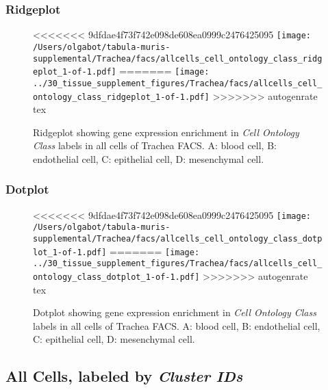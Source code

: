\subsubsection{Ridgeplot}
\begin{figure}[h]
\centering
<<<<<<< 9dfdae4f73f742e098de608ea0999c2476425095
\texttt{[image: /Users/olgabot/tabula-muris-supplemental/Trachea/facs/allcells\_cell\_ontology\_class\_ridgeplot\_1-of-1.pdf]}
=======
\texttt{[image: ../30\_tissue\_supplement\_figures/Trachea/facs/allcells\_cell\_ontology\_class\_ridgeplot\_1-of-1.pdf]}
>>>>>>> autogenrate tex

\caption{ Ridgeplot  showing gene expression enrichment in \emph{Cell Ontology Class} labels in all cells of Trachea FACS. A: blood cell, B: endothelial cell, C: epithelial cell, D: mesenchymal cell.}
\end{figure}


\clearpage

\subsubsection{Dotplot}
\begin{figure}[h]
\centering
<<<<<<< 9dfdae4f73f742e098de608ea0999c2476425095
\texttt{[image: /Users/olgabot/tabula-muris-supplemental/Trachea/facs/allcells\_cell\_ontology\_class\_dotplot\_1-of-1.pdf]}
=======
\texttt{[image: ../30\_tissue\_supplement\_figures/Trachea/facs/allcells\_cell\_ontology\_class\_dotplot\_1-of-1.pdf]}
>>>>>>> autogenrate tex

\caption{ Dotplot  showing gene expression enrichment in \emph{Cell Ontology Class} labels in all cells of Trachea FACS. A: blood cell, B: endothelial cell, C: epithelial cell, D: mesenchymal cell.}
\end{figure}


\clearpage

\subsection{All Cells, labeled by \emph{Cluster IDs}}
